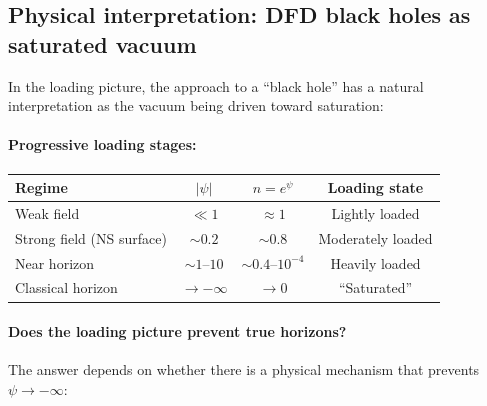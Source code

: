 \documentclass[11pt,a4paper]{article}
\begin{document}
\subsection{Physical interpretation: DFD black holes as saturated vacuum}

In the loading picture, the approach to a ``black hole'' has a natural
interpretation as the vacuum being driven toward saturation:

\paragraph{Progressive loading stages:}
\begin{center}
\begin{tabular}{lccc}
\toprule
\textbf{Regime} & \textbf{$|\psi|$} & \textbf{$n = e^\psi$} &
\textbf{Loading state} \\
\midrule
Weak field & $\ll 1$ & $\approx 1$ & Lightly loaded \\
Strong field (NS surface) & $\sim 0.2$ & $\sim 0.8$ & Moderately loaded \\
Near horizon & $\sim 1$--$10$ & $\sim 0.4$--$10^{-4}$ & Heavily loaded \\
Classical horizon & $\to -\infty$ & $\to 0$ & ``Saturated'' \\
\bottomrule
\end{tabular}
\end{center}

\paragraph{Does the loading picture prevent true horizons?}

The answer depends on whether there is a physical mechanism that prevents
$\psi \to -\infty$:
\end{document}
